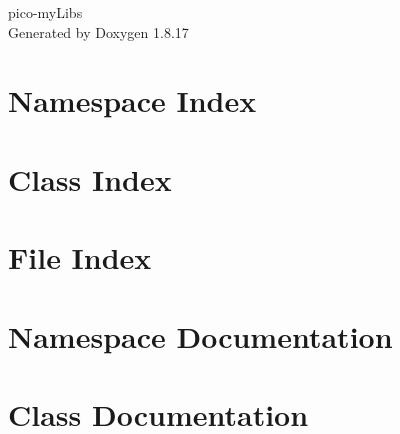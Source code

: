 \let\mypdfximage\pdfximage\def\pdfximage{\immediate\mypdfximage}\documentclass[twoside]{book}
\newcommand{\+}{\discretionary{\mbox{\scriptsize$\hookleftarrow$}}{}{}}
\newcommand{\clearemptydoublepage}{%
  \newpage{\pagestyle{empty}\cleardoublepage}%
}
\begin{document}
\hypersetup{pageanchor=false,
             bookmarksnumbered=true,
             pdfencoding=unicode
            }
\begin{titlepage}
\vspace*{7cm}
\begin{center}%
{\Large pico-\/my\+Libs }\\
\vspace*{1cm}
{\large Generated by Doxygen 1.8.17}\\
\end{center}
\end{titlepage}
\clearemptydoublepage
{}
\tableofcontents
\clearemptydoublepage
{}
\hypersetup{pageanchor=true}

\chapter{Namespace Index}

\chapter{Class Index}

\chapter{File Index}

\chapter{Namespace Documentation}







\chapter{Class Documentation}










\end{document}
